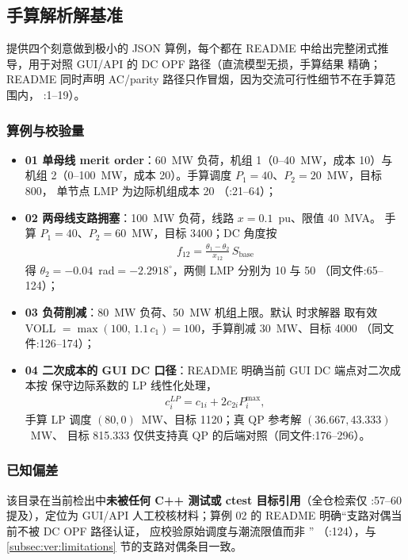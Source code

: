 \subsection{手算解析解基准}\label{subsec:ver:hand}

 提供四个刻意做到极小的 JSON 算例，每个都在
README 中给出完整闭式推导，用于对照 GUI/API 的 DC OPF 路径（直流模型无损，手算结果
精确；README 同时声明 AC/parity 路径只作冒烟，因为交流可行性细节不在手算范围内，
:1--19）。

\subsubsection*{算例与校验量}
\begin{itemize}
  \item \textbf{01 单母线 merit order}：60~MW 负荷，机组 1（0--40~MW，成本 10）与
        机组 2（0--100~MW，成本 20）。手算调度 $P_1=40$、$P_2=20$~MW，目标 800，
        单节点 LMP 为边际机组成本 20
        （:21--64）；
  \item \textbf{02 两母线支路拥塞}：100~MW 负荷，线路 $x=0.1$~pu、限值 40~MVA。
        手算 $P_1=40$、$P_2=60$~MW，目标 3400；DC 角度按
        \begin{align*}
        f_{12}=\frac{\theta_1-\theta_2}{x_{12}}\,S_{\mathrm{base}}
        \end{align*}
        得 $\theta_2=-0.04$~rad$=-2.2918^\circ$，两侧 LMP 分别为 10 与 50
        （同文件:65--124）；
  \item \textbf{03 负荷削减}：80~MW 负荷、50~MW 机组上限。默认  时求解器
        取有效 VOLL $=\max(100,\,1.1\,c_1)=100$，手算削减 30~MW、目标 4000
        （同文件:126--174）；
  \item \textbf{04 二次成本的 GUI DC 口径}：README 明确当前 GUI DC 端点对二次成本按
        保守边际系数的 LP 线性化处理，
        \begin{align*}
        c_i^{LP}=c_{1i}+2c_{2i}P_i^{\max},
        \end{align*}
        手算 LP 调度 $(80,0)$~MW、目标 1120；真 QP 参考解 $(36.667,43.333)$~MW、
        目标 815.333 仅供支持真 QP 的后端对照（同文件:176--296）。
\end{itemize}

\subsubsection*{已知偏差}
该目录在当前检出中\textbf{未被任何 C++ 测试或 ctest 目标引用}（全仓检索仅
:57--60 提及），定位为
GUI/API 人工校核材料；算例 02 的 README 明确“支路对偶当前不被 DC OPF 路径认证，
应校验原始调度与潮流限值而非 ”
（:124），与
\ref{subsec:ver:limitations} 节的支路对偶条目一致。

